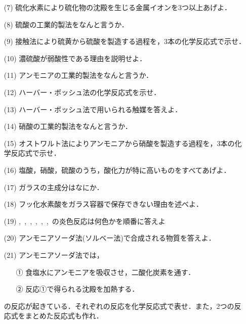 \documentclass[a4paper,twocolumn,11pt]{ltjsarticle}
\begin{document}
        \begin{itemize}
    \item [(7)]硫化水素により硫化物の沈殿を生じる金属イオンを3つ以上あげよ．\\[2cm]
            \item [(8)]硫酸の工業的製法をなんと言うか．\\[2cm]
    \item [(9)]接触法により硫黄から硫酸を製造する過程を，3本の化学反応式で示せ．\\[4cm]
    \item [(10)]濃硫酸が弱酸性である理由を説明せよ．\\[3cm]
    \item[(11)]アンモニアの工業的製法をなんと言うか．\\[2cm]
    \newpage
    \item[(12)]ハーバー・ボッシュ法の化学反応式を示せ．\\[2cm]
    \item[(13)]ハーバー・ボッシュ法で用いられる触媒を答えよ．\\[2cm]
    \item[(14)]硝酸の工業的製法をなんと言うか．\\[2cm]
    \item[(15)]オストワルト法によりアンモニアから硝酸を製造する過程を，3本の化学反応式で示せ．\\ [4cm]
    \item[(16)]塩酸，硝酸，硫酸のうち，酸化力が特に高いものをすべてあげよ．\\[2cm]
    \item[(17)]ガラスの主成分はなにか．
    \newpage
    \item[(18)]フッ化水素酸をガラス容器で保存できない理由を述べよ．\\[2cm]
    \item[(19)],~,~,~,~,~,~の炎色反応は何色かを順番に答えよ\\[2cm]
    \item[(20)]アンモニアソーダ法(ソルベー法)で合成される物質を答えよ．\\[2cm]
    \item[(21)]アンモニアソーダ法では，\begin{itemize}
        \item [①]食塩水にアンモニアを吸収させ，二酸化炭素を通す．
        \item[②]反応①で得られる沈殿を加熱する．
    \end{itemize}
    の反応が起きている．それぞれの反応を化学反応式で表せ．また，2つの反応式をまとめた反応式も作れ．\newpage

\end{itemize}
\end{document}
